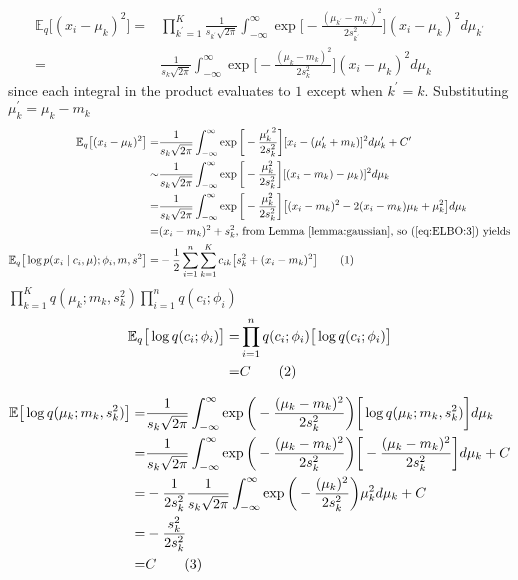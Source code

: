 \documentclass[]{article}
\newcommand{\Expectation} {\mathbb{E}}
\newcommand\numberthis    {\addtocounter{equation}{1}\tag{\theequation}}
\begin{document}
\begin{align*}
	\Expectation_q\big[(x_i-\mu_k)^2\big]
	=& \prod_{k^\prime=1}^{K}\frac{1}{s_{k^\prime}\sqrt{2\pi}}  \int_{-\infty}^{\infty} \exp{\bigg[-\frac{(\mu_{k^\prime}-m_{k^\prime})^2}{2 s_{k^\prime}^2}\bigg]}(x_i-\mu_k)^2 d \mu_{k^\prime}\\
	=& \frac{1}{s_k\sqrt{2\pi}}  \int_{-\infty}^{\infty} \exp{\bigg[-\frac{(\mu_k-m_k)^2}{2 s_k^2}\bigg]}(x_i-\mu_k)^2 d \mu_k
\end{align*}
since each integral in the product evaluates to $1$ except when ${k^\prime}=k$. Substituting $\mu^\prime_k=\mu_k-m_k$
\begin{align*}
	\Expectation_q\big[(x_i-\mu_k)^2\big]=&\frac{1}{s_k\sqrt{2\pi}}  \int_{-\infty}^{\infty} \exp{\bigg[-\frac{{\mu^\prime_k}^2}{2 s_k^2}\bigg]}[x_i-(\mu^\prime_k+m_k)]^2 d \mu^\prime_k + C^\prime \\
	\sim&\frac{1}{s_k\sqrt{2\pi}}  \int_{-\infty}^{\infty} \exp{\bigg[-\frac{\mu_k^2}{2 s_k^2}\bigg]}[(x_i-m_k)-\mu_k)]^2 d \mu_k\\
	=&\frac{1}{s_k\sqrt{2\pi}}  \int_{-\infty}^{\infty} \exp{\bigg[-\frac{\mu_k^2}{2 s_k^2}\bigg]}\big[(x_i-m_k)^2-2(x_i-m_k)\mu_k+\mu_k^2\big] d \mu_k\\
	=& (x_i-m_k)^2 + s_k^2 \text{, from Lemma \ref{lemma:gaussian}, so  (\ref{eq:ELBO:3}) yields}\\
	\Expectation_q\big[\log{p(x_i\mid c_i,\mu);\phi_i,m,s^2}\big] =&  -\frac{1}{2} \sum_{i=1}^{n} \sum_{k=1}^{K}c_{ik} \big[s_k^2 + (x_i-m_k)^2 \big] \numberthis \label{eq:ELBO:3F}
\end{align*}
$\prod_{k=1}^{K} q(\mu_k;m_k,s_k^2) \prod_{i=1}^{n}q(c_i;\phi_i)$
\begin{align*}
	\Expectation_q\big[\log{q(c_i;\phi_i)}\big] =& \prod_{i=1}^{n}q(c_i;\phi_i) \big[\log{q(c_i;\phi_i)}\big]\\
	=& C \numberthis \label{eq:ELBO:4}
\end{align*}

\begin{align*} 
 	\Expectation \big[\log{q(\mu_k;m_k,s^2_k)}\big] =& \frac{1}{s_k\sqrt{2\pi}} \int_{-\infty}^{\infty} \exp{\bigg(- \frac{(\mu_k-m_k)^2}{2 s_k^2}\bigg)} \bigg[\log{q(\mu_k;m_k,s^2_k)} \bigg] d\mu_k \\
 	 =& \frac{1}{s_k\sqrt{2\pi}} \int_{-\infty}^{\infty} \exp{\bigg(- \frac{(\mu_k-m_k)^2}{2 s_k^2}\bigg)} \bigg[- \frac{(\mu_k-m_k)^2}{2 s_k^2}\bigg] d\mu_k + C\\
 	  =& - \frac{1 }{2 s_k^2} \frac{1}{ s_k\sqrt{2\pi}} \int_{-\infty}^{\infty} \exp{\bigg(- \frac{(\mu_k)^2}{2 s_k^2}\bigg)} \mu_k^2 d\mu_k + C\\
 	=& - \frac{s_k^2 }{2 s_k^2} \\
 	=& C \numberthis \label{eq:ELBO:5}
\end{align*}
\end{document}
